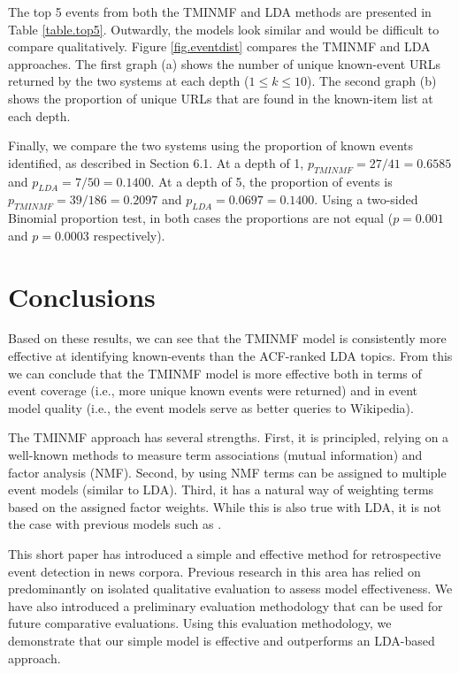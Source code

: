 \documentclass{sig-alternate}
\begin{document}
The top 5 events from both the TMINMF and LDA methods are presented in Table \ref{table.top5}. Outwardly, the models look similar and would be difficult to compare qualitatively.  Figure \ref{fig.eventdist} compares the TMINMF and LDA approaches.  The first graph (a) shows the number of unique known-event URLs returned by the two systems at each depth ($1 \le k \le 10$).  The second graph (b) shows the proportion of unique URLs that are found in the known-item list  at each depth.

Finally, we compare the two systems using the proportion of known events identified, as described in Section 6.1.  At a depth of 1,   $p_{TMINMF}=27/41=0.6585$ and $p_{LDA}=7/50=0.1400$.  At a depth of 5, the proportion of events is $p_{TMINMF}=39/186=0.2097$ and $p_{LDA}=0.0697=0.1400$. Using a two-sided Binomial proportion test, in both cases the proportions are not equal ($p = 0.001$ and $p = 0.0003$ respectively).


\section{Conclusions}

Based on these results, we can see that the TMINMF model is consistently more effective at identifying known-events than the ACF-ranked LDA topics.  From this we can conclude that the TMINMF model is more effective both in terms of event coverage (i.e., more unique known events were returned) and in event model quality (i.e., the event models serve as better queries to Wikipedia).  

The TMINMF approach has several strengths. First, it is principled, relying on a well-known methods to measure term associations (mutual information) and factor analysis (NMF). Second, by using NMF terms can be assigned to multiple event models (similar to LDA).  Third, it has a natural way of weighting terms based on the assigned factor weights. While this is also true with LDA, it is not the case with previous models such as \cite{He2007}.  

This short paper has introduced a simple and effective method for retrospective event detection in news corpora. Previous research in this area has relied on predominantly on isolated qualitative evaluation to assess model effectiveness. We have also introduced a preliminary evaluation methodology that can be used for future comparative evaluations. Using this evaluation methodology, we demonstrate that our simple model is effective and outperforms an LDA-based approach. 
\end{document}
